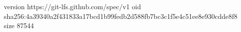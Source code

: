 version https://git-lfs.github.com/spec/v1
oid sha256:4a39340a2f431833a17bcd1b99fedb2d588fb7bc3c1f5e4c51ee8e930cdde8f8
size 87544
